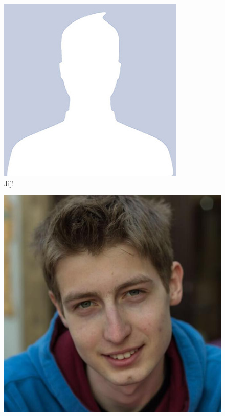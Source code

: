 \begin{frame}
\begin{figure}
\begin{minipage}{0.3\linewidth}
				\includegraphics[width=\linewidth]{res/you} \\
            	\footnotesize Jij!
        	\end{minipage}
            \begin{minipage}{0.3\linewidth}
            	\centering
				\includegraphics[width=\linewidth]{res/igor} \\

\end{minipage}
\end{figure}
\end{frame}
